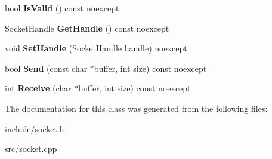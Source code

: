 \begin{DoxyCompactItemize}
\item 
\mbox{\label{class_blade_1_1_socket_ac459be555495e99117c4a98a50e2f92b}} 
bool {\bfseries Is\+Valid} () const noexcept
\item 
\mbox{\label{class_blade_1_1_socket_a1af1996fc8de7ba17106903560d45efb}} 
Socket\+Handle {\bfseries Get\+Handle} () const noexcept
\item 
\mbox{\label{class_blade_1_1_socket_adb437f4e6ee09e6bcaf6b48d536e504e}} 
void {\bfseries Set\+Handle} (Socket\+Handle handle) noexcept
\item 
\mbox{\label{class_blade_1_1_socket_a619058cf7a937e45aa0d4e50971bde24}} 
bool {\bfseries Send} (const char $\ast$buffer, int size) const noexcept
\item 
\mbox{\label{class_blade_1_1_socket_ab6e77d46652d77508f6fdd1c5d3161ba}} 
int {\bfseries Receive} (char $\ast$buffer, int size) const noexcept
\end{DoxyCompactItemize}


The documentation for this class was generated from the following files\+:\begin{DoxyCompactItemize}
\item 
include/socket.\+h\item 
src/socket.\+cpp\end{DoxyCompactItemize}

